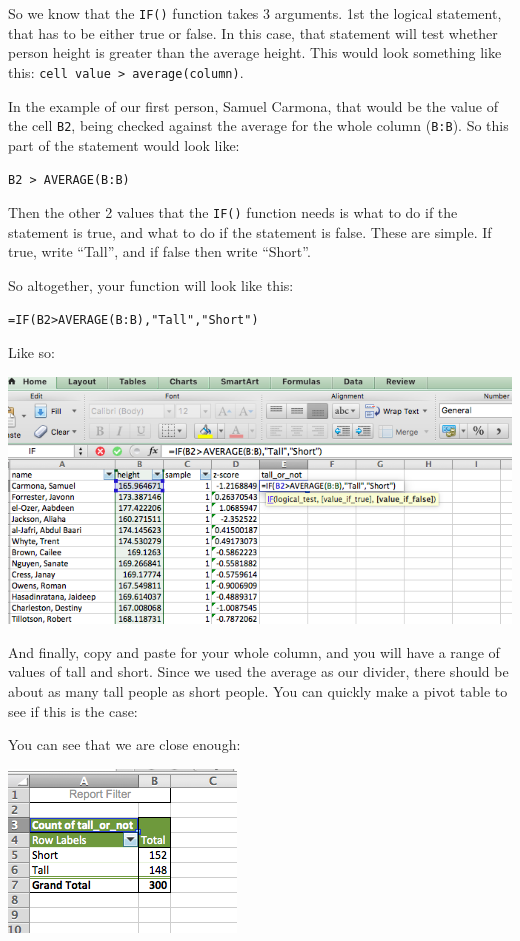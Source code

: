\documentclass[]{book}
\theoremstyle{definition}
\theoremstyle{definition}
\theoremstyle{definition}
\theoremstyle{remark}
\begin{document}
So we know that the \texttt{IF()} function takes 3 arguments. 1st the
logical statement, that has to be either true or false. In this case,
that statement will test whether person height is greater than the
average height. This would look something like this:
\texttt{cell\ value\ \textgreater{}\ average(column)}.

In the example of our first person, Samuel Carmona, that would be the
value of the cell \texttt{B2}, being checked against the average for the
whole column (\texttt{B:B}). So this part of the statement would look
like:

\texttt{B2\ \textgreater{}\ AVERAGE(B:B)}

Then the other 2 values that the \texttt{IF()} function needs is what to
do if the statement is true, and what to do if the statement is false.
These are simple. If true, write ``Tall'', and if false then write
``Short''.

So altogether, your function will look like this:

\texttt{=IF(B2\textgreater{}AVERAGE(B:B),"Tall","Short")}

Like so:

\includegraphics{imgs/ifelse_tallshort.png}

And finally, copy and paste for your whole column, and you will have a
range of values of tall and short. Since we used the average as our
divider, there should be about as many tall people as short people. You
can quickly make a pivot table to see if this is the case:

You can see that we are close enough:

\includegraphics{imgs/tallshort_pivot.png}
\end{document}
